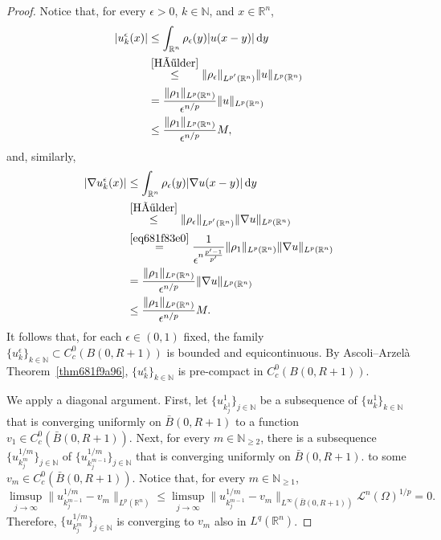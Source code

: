 \documentclass[a4paper,9pt]{amsart}
\newcommand{\scr}[1]{\mathscr{#1}}
\newcommand{\N}{\mathbb{N}}	%
\newcommand{\R}{\mathbb{R}}	%
\newcommand{\did}{\,\mathrm{d}}	%
\newcommand{\grad}{\nabla}
\theoremstyle{plain}
\theoremstyle{definition}
\theoremstyle{remark}
\begin{document}
\begin{proof}
	Notice that, for every $\epsilon>0$, $k\in\N$, and $x\in\R^n$,
	\begin{equation}
	\begin{aligned}
		|u_k^\epsilon(x)| 
		&\le \int_{\R^n} \rho_\epsilon(y) |u(x-y)| \did y \\
		&\overset{\eqref{Hölder}}\le \|\rho_\epsilon\|_{L^{p'}(\R^n)} \|u\|_{L^p(\R^n)} \\
		&= \frac{ \|\rho_1\|_{L^p(\R^n)} }{ \epsilon^{n/p} } \|u\|_{L^p(\R^n)} \\
		&\le \frac{ \|\rho_1\|_{L^p(\R^n)} }{ \epsilon^{n/p} } M ,
	\end{aligned}
	\end{equation}
	and, similarly,
	\begin{equation}\label{eq681f848e}
	\begin{aligned}
		|\grad u_k^\epsilon(x)|
		&\le \int_{\R^n} \rho_\epsilon(y) |\grad u(x-y)| \did y \\
		&\overset{\eqref{Hölder}}\le \|\rho_\epsilon\|_{L^{p'}(\R^n)} \|\grad u\|_{L^p(\R^n)} \\
		&\overset{\eqref{eq681f83e0}}= \frac1{\epsilon^{n\frac{p'-1}{p'}}} \|\rho_1\|_{L^p(\R^n)} \|\grad u\|_{L^p(\R^n)} \\
		&= \frac{ \|\rho_1\|_{L^p(\R^n)} }{ \epsilon^{n/p} } \|\grad u\|_{L^p(\R^n)} \\
		&\le \frac{ \|\rho_1\|_{L^p(\R^n)} }{ \epsilon^{n/p} } M .
	\end{aligned}
	\end{equation}
	It follows that, for each $\epsilon\in(0,1)$ fixed, the family $\{u_k^\epsilon\}_{k\in\N} \subset C^0_c(B(0,R+1))$ is bounded and equicontinuous.
	By Ascoli--Arzelà Theorem~\ref{thm681f9a96}, 
	$\{u_k^\epsilon\}_{k\in\N}$ is pre-compact in $C^0_c(B(0,R+1))$.
	
	We apply a diagonal argument.
	First, let $\{u_{k^1_j}^{1}\}_{j\in\N}$ be a subsequence of $\{u_k^1\}_{k\in\N}$ that is converging uniformly on $\bar B(0,R+1)$ to a function $v_1\in C^0_c(\bar B(0,R+1))$.
	Next, for every $m\in\N_{\ge2}$, there is a subsequence $\{u_{k^m_j}^{1/m}\}_{j\in\N}$ of $\{u_{k^{m-1}_j}^{1/m}\}_{j\in\N}$ that is converging uniformly on $\bar B(0,R+1)$.
	to some $v_m\in C^0_c(\bar B(0,R+1))$.
	Notice that, for every $m\in\N_{\ge1}$,
	\begin{equation}
		\limsup_{j\to\infty} \|u_{k^{m-1}_j}^{1/m} - v_m\|_{L^p(\R^n)}
		\le \limsup_{j\to\infty} \|u_{k^{m-1}_j}^{1/m} - v_m\|_{L^\infty(\bar B(0,R+1))} \scr L^n(\Omega)^{1/p}
		= 0 .
	\end{equation}
	Therefore, $\{u_{k^m_j}^{1/m}\}_{j\in\N}$ is converging to $v_m$ also in $L^q(\R^n)$.
	

\end{proof}
\end{document}
